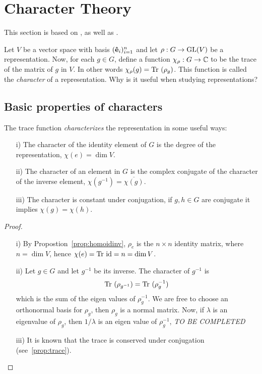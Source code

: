 \clearpage{\thispagestyle{empty}}
\section{Character Theory}

This section is based on \cite[Ch.2.]{Serre}, as well as \cite[Sect.2.2.]{FultonHarris}.

Let $V$ be a vector space with basis $(\mathbf{\hat{e}}_i)_{i=1}^n$ and let $\rho: G \rightarrow \text{GL}(V)$ be a representation. Now, for each $g \in G$, define a function $\chi_{\rho}: G \rightarrow \mathbb{C}$ to be the trace of the matrix of $g$ in $V$. In other words $\chi_{\rho}(g) = \text{Tr }(\rho_g)$. This function is called the \emph{character} of a representation. Why is it useful when studying representations?

\subsection{Basic properties of characters}

\begin{proposition}\cite[Prop.2.1.]{Serre}\label{prop:charidinvconj}
	The trace function \emph{characterizes} the representation in some useful ways:
	\begin{enumerate}
		\item[i)] The character of the identity element of $G$ is the degree of the representation, $\chi(e) = \dim V$.
		\item[ii)] The character of an element in $G$ is the complex conjugate of the character of the inverse element, $\chi(g^{-1}) = \overline{\chi(g)}$.
		\item[iii)] The character is constant under conjugation, if $g,h\in G$ are conjugate it implies $\chi(g) = \chi(h)$.
	\end{enumerate}
\end{proposition}
\begin{proof}
	\begin{enumerate}
		\item[i)] By Propostion~\ref{prop:homoidinv}, $\rho_e$ is the $n \times n$ identity matrix, where $n = \dim V$, hence $\chi(e) = \text{Tr } \text{id} = n = \dim V$.
		\item[ii)] Let $g \in G$ and let $g^{-1}$ be its inverse. The character of $g^{-1}$ is 
		\begin{align*}
			\text{Tr }(\rho_{g^{-1}}) = \text{Tr }(\rho_g^{-1})
		\end{align*}
		which is the sum of the eigen values of $\rho_g^{-1}$. We are free to choose an orthonormal basis for $\rho_g$, then $\rho_g$ is a normal matrix. Now, if $\lambda$ is an eigenvalue of $\rho_g$, then $1/\lambda$ is an eigen value of $\rho_g^{-1}$, \textit{TO BE COMPLETED}

		\item[iii)] It is known that the trace is conserved under conjugation (see~\ref{prop:trace}).\qedhere
	\end{enumerate}
\end{proof}

